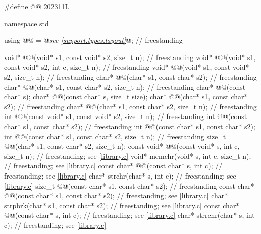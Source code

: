 \begin{codeblock}
#define @@ 202311L

namespace std {
  using @@ = @\textit{see \ref{support.types.layout}}@;                                            // freestanding

  void* @@(void* s1, const void* s2, size_t n);                     // freestanding
  void* @@(void* s1, const void* s2, int c, size_t n);             // freestanding
  void* @@(void* s1, const void* s2, size_t n);                    // freestanding
  char* @@(char* s1, const char* s2);                               // freestanding
  char* @@(char* s1, const char* s2, size_t n);                    // freestanding
  char* @@(const char* s);
  char* @@(const char* s, size_t size);
  char* @@(char* s1, const char* s2);                               // freestanding
  char* @@(char* s1, const char* s2, size_t n);                    // freestanding
  int @@(const void* s1, const void* s2, size_t n);                 // freestanding
  int @@(const char* s1, const char* s2);                           // freestanding
  int @@(const char* s1, const char* s2);
  int @@(const char* s1, const char* s2, size_t n);                // freestanding
  size_t @@(char* s1, const char* s2, size_t n);
  const void* @@(const void* s, int c, size_t n);                   // freestanding; see \ref{library.c}
  void* memchr(void* s, int c, size_t n);                               // freestanding; see \ref{library.c}
  const char* @@(const char* s, int c);                             // freestanding; see \ref{library.c}
  char* strchr(char* s, int c);                                         // freestanding; see \ref{library.c}
  size_t @@(const char* s1, const char* s2);                       // freestanding
  const char* @@(const char* s1, const char* s2);                  // freestanding; see \ref{library.c}
  char* strpbrk(char* s1, const char* s2);                              // freestanding; see \ref{library.c}
  const char* @@(const char* s, int c);                            // freestanding; see \ref{library.c}
  char* strrchr(char* s, int c);                                        // freestanding; see \ref{library.c}
}
\end{codeblock}
